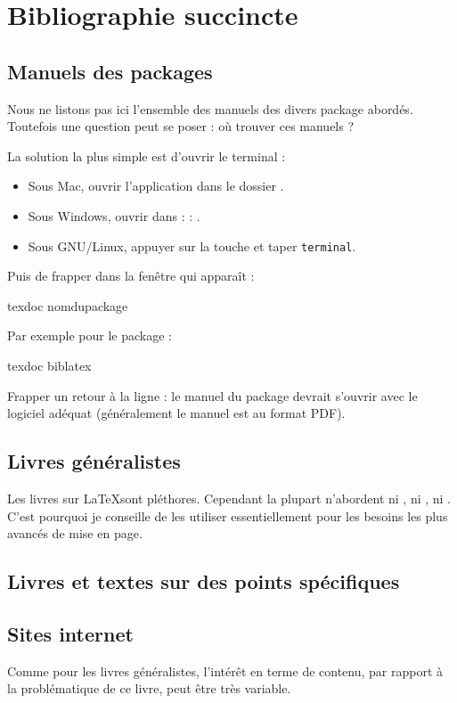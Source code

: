 \chapter{Bibliographie succincte}

\nocite{*}
\section{Manuels des packages \label{manuels}}


Nous ne listons pas ici l'ensemble des manuels des divers package abordés. Toutefois une question peut se poser : où trouver ces manuels ?

La solution la plus simple est d'ouvrir le terminal :
\begin{itemize}
\item Sous Mac, ouvrir l'application  dans le dossier .
\item Sous Windows, ouvrir  dans  :  : .
\item Sous GNU/Linux, appuyer sur la touche  et  taper \verb|terminal|.
\end{itemize}

Puis de frapper dans la fenêtre qui apparaît :

\begin{bashcode}
texdoc nomdupackage
\end{bashcode}

Par exemple pour le package :

\begin{bashcode}
texdoc biblatex
\end{bashcode}

Frapper un retour à la ligne : le manuel du package devrait s'ouvrir avec le logiciel adéquat (généralement le manuel est au format PDF).

\section{Livres généralistes}

Les livres sur \LaTeX sont pléthores. Cependant la plupart n'abordent ni \XeLaTeX, ni , ni . C'est pourquoi je conseille de les utiliser essentiellement pour les besoins les plus avancés de mise en page.

\printbibliography[keyword=generaliste]

\section{Livres et textes sur des points spécifiques}

\printbibliography[keyword=specifique]


\section{Sites internet}

Comme pour les livres généralistes,  l'intérêt en terme de contenu, par rapport à la problématique de ce livre, peut être très variable. 

\printbibliography[keyword=site]
